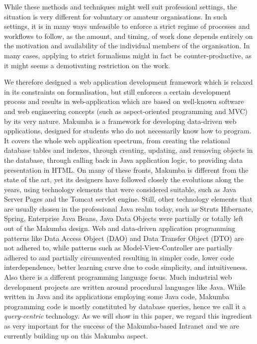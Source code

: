 \documentclass{llncs}
\begin{document}
While these methods and techniques might well suit professionl settings, the situation is very different for voluntary or amateur organisations. In such settings, it is in many ways unfeasible to enforce a strict regime of processes and workflows to follow, as the amount, and timing, of work done depends entirely on the motivation and availability of the individual members of the organisation. In many cases, applying to strict formalisms might in fact be counter-productive, as it might seems a demotivating restriction on the work.

We therefore designed a web application development framework which is relaxed in its constraints on formalisation, but still enforces a certain development process and results in web-application which are based on well-known software and web engineering concepts (such as aspect-oriented programming and MVC) by its very nature. 
Makumba is a framework for developing data-driven web applications, designed for students who do not necessarily know how to program. It covers the whole  web application spectrum, from creating the relational database tables and indexes, through creating, updating, and removing objects in the database, through calling back in Java application logic, to providing data presentation in HTML. On many of these fronts, Makumba is different from the state of the art, yet its designers have followed closely the evolutions along the years, using technology elements that were considered suitable, such as Java Server Pages and the Tomcat servlet engine. Still, other technology elements that are usually chosen in the professional Java realm today, such as Struts
Hibernate, Spring, Enterprise Java Beans, Java Data Objects were partially or totally left out of the Makumba design. Web and data-driven application programming patterns like Data Access Object (DAO) and Data Transfer Object (DTO) are not adhered to, while patterns such as Model-View-Controller are partially adhered to and partially circumvented resulting in simpler code, lower code interdependence, better learning curve due to code simplicity, and intuitiveness. Also  there is a different programming language focus. Much industrial web development projects are written around procedural languages like  Java. While written in Java and its applications employing some Java code, Makumba programming code is mostly constituted by database queries, hence we call it a \textit{query-centric} technology. As we will show in this paper, we regard this ingredient as very important for the success of the Makumba-based Intranet and we are currently building up on this Makumba aspect.
\end{document}
